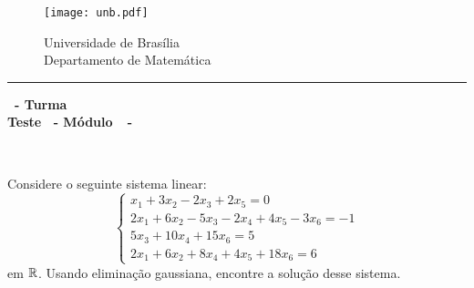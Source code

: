 \documentclass[12pt]{exam}
\begin{document}
    \begin{figure}[h]
        \begin{minipage}[c]{1.7cm}
            \texttt{[image: unb.pdf]}
        \end{minipage}
        \hspace{0pt}
        \begin{minipage}[c]{4in}
            {Universidade de Brasília} \\
            {Departamento de Matemática}
        \end{minipage}
    \end{figure}
    \hrule
    \begin{center}
        {\Large\bf \disciplina\ - Turma \turma}  \\
         {\large\bf Teste \numeroteste\ - Módulo\ \modulo\ -\ \dataavaliacao}
    \end{center}

    \\
    \vspace*{.01cm}

    \vspace{.4cm}

    \questao{} Considere o seguinte sistema linear:
    \[
        \begin{cases}
            x_1 + 3x_2 - 2x_3 + 2x_5 = 0\\
            2x_1 + 6x_2 - 5x_3 - 2x_4 + 4x_5 - 3x_6 = -1\\
            5x_3 + 10x_4 + 15x_6 = 5\\
            2x_1 + 6x_2 + 8x_4 + 4x_5 + 18x_6 = 6
        \end{cases}
    \]
em $\mathbb{R}$. Usando eliminação gaussiana, encontre a solução desse sistema.
\end{document}
